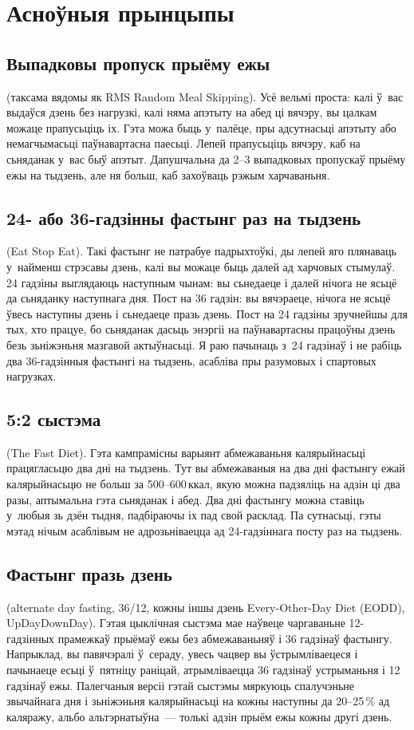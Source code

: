 \section{Асноўныя прынцыпы}

\subsection{Выпадковы пропуск прыёму ежы} (таксама вядомы як RMS Random Meal Skipping).
Усё вельмі проста: калі ў~вас выдаўся дзень без нагрузкі, калі няма апэтыту на абед ці вячэру, вы цалкам можаце прапусьціць іх. Гэта можа быць у~палёце, пры адсутнасьці апэтыту або немагчымасьці паўнавартасна паесьці. Лепей прапусьціць вячэру, каб на сьняданак у~вас быў апэтыт. Дапушчальна да 2--3 выпадковых пропускаў прыёму ежы на тыдзень, але ня больш, каб захоўваць рэжым харчаваньня.

\subsection{24- або 36-гадзінны фастынг раз на тыдзень} (Eat Stop Eat).
Такі фастынг не патрабуе падрыхтоўкі, ды лепей яго плянаваць у~найменш стрэсавы дзень, калі вы можаце быць далей ад харчовых стымулаў. 24 гадзіны выглядаюць наступным чынам: вы сьнедаеце і далей нічога не ясьцё да сьняданку наступнага дня. Пост на 36 гадзін: вы вячэраеце, нічога не ясьцё ўвесь наступны дзень і сьнедаеце празь дзень. Пост на 24 гадзіны зручнейшы для тых, хто працуе, бо сьняданак дасьць энэргіі на паўнавартасны працоўны дзень безь зьніжэньня мазгавой актыўнасьці. Я раю пачынаць з~24 гадзінаў і не рабіць два 36-гадзінныя фастынгі на тыдзень, асабліва пры разумовых і спартовых нагрузках.

\subsection{5:2 сыстэма} (The Fast Diet).
Гэта кампрамісны варыянт абмежаваньня калярыйнасьці працягласьцю два дні на тыдзень. Тут вы абмежаваныя на два дні фастынгу ежай калярыйнасьцю не больш за 500--600\,ккал, якую можна падзяліць на адзін ці два разы, аптымальна гэта сьняданак і абед. Два дні фастынгу можна ставіць у~любыя зь дзён тыдня, падбіраючы іх пад свой расклад. Па сутнасьці, гэты мэтад нічым асаблівым не адрозьніваецца ад 24-гадзіннага посту раз на тыдзень.

\subsection{Фастынг празь дзень} (alternate day fasting, 36/12, кожны іншы дзень Every-Other-Day Diet (EODD), UpDayDownDay).
Гэтая цыклічная сыстэма мае наўвеце чаргаваньне 12-гадзінных прамежкаў прыёмаў ежы без абмежаваньняў і 36 гадзінаў фастынгу. Напрыклад, вы павячэралі ў~сераду, увесь чацвер вы ўстрымліваецеся і пачынаеце есьці ў~пятніцу раніцай, атрымліваецца 36 гадзінаў устрыманьня і 12 гадзінаў ежы. Палегчаныя версіі гэтай сыстэмы мяркуюць спалучэньне звычайнага дня і зьніжэньня калярыйнасьці на кожны наступны да 20--25\,\% ад каляражу, альбо альтэрнатыўна~--- толькі адзін прыём ежы кожны другі дзень.

